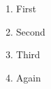 \documentclass{article}
\begin{document}
\begin{enumerate}%
\renewcommand{\labelenumi}{\greek{enumi}.}
\item First
\item Second
\item Third
\setcounter{enumi}{42}
\item Again
\end{enumerate}
\end{document}
